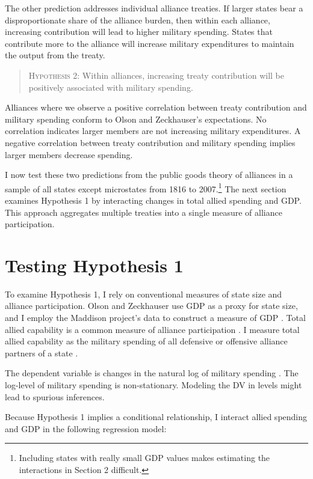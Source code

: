 \documentclass[12pt]{article}
\begin{document}
The other prediction addresses individual alliance treaties. 
If larger states bear a disproportionate share of the alliance burden, then within each alliance, increasing contribution will lead to higher military spending. 
States that contribute more to the alliance will increase military expenditures to maintain the output from the treaty. 


\begin{quote}
\textsc{Hypothesis 2}: Within alliances, increasing treaty contribution will be positively associated with military spending. 
\end{quote}


Alliances where we observe a positive correlation between treaty contribution and military spending conform to Olson and Zeckhauser's expectations. 
No correlation indicates larger members are not increasing military expenditures.
A negative correlation between treaty contribution and military spending implies larger members decrease spending. 


I now test these two predictions from the public goods theory of alliances in a sample of all states except microstates from 1816 to 2007.\footnote{Including states with really small GDP values makes estimating the interactions in Section 2 difficult.}
The next section examines Hypothesis 1 by interacting changes in total allied spending and GDP.
This approach aggregates multiple treaties into a single measure of alliance participation. 


\section{Testing Hypothesis 1}

To examine Hypothesis 1, I rely on conventional measures of state size and alliance participation. 
Olson and Zeckhauser use GDP as a proxy for state size, and I employ the Maddison project's data to construct a measure of GDP \citep{Boltetal2018}. 
Total allied capability is a common measure of alliance participation \citep{Sorokin1994, MorganPalmer2003}. 
I measure total allied capability as the military spending of all defensive or offensive alliance partners of a state \citep{Leedsetal2002}. 


The dependent variable is changes in the natural log of military spending \citep{SingerCINC1988}. The log-level of military spending is non-stationary.
Modeling the DV in levels might lead to spurious inferences. 


Because Hypothesis 1 implies a conditional relationship, I interact allied spending and GDP in the following regression model:
\end{document}
